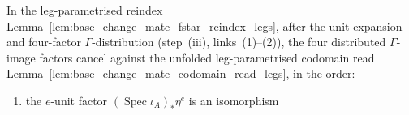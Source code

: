 \begin{lemma}


  \label{lem:base_change_mate_inner_eCancel_assemble}
  In the leg-parametrised reindex Lemma~\ref{lem:base_change_mate_fstar_reindex_legs}, after the
  unit expansion and four-factor \(\Gamma\)-distribution (step~(iii), links~(1)--(2)), the four
  distributed \(\Gamma\)-image factors cancel against the unfolded leg-parametrised codomain read
  Lemma~\ref{lem:base_change_mate_codomain_read_legs}, in the order:
  \begin{enumerate}
    \item the \(e\)-unit factor \((\operatorname{Spec}\iota_A)_{*}\eta^{e}\) is an isomorphism

\end{enumerate}
\end{lemma}
